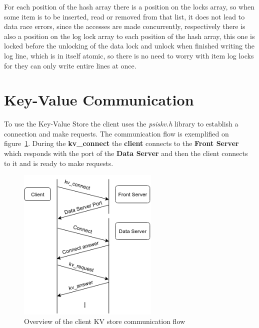 \documentclass[12pt]{article} %
\begin{document}

For each position of the hash array there is a position on the locks array,
so when some item is to be inserted, read or removed from that list, it does not
lead to data race errors, since the accesses are made concurrently, respectively
there is also a position on the log lock array to each position of the hash array,
this one is locked before the unlocking of the data lock and unlock when finished
writing the log line, which is in itself atomic, so there is no need to worry with
item log locks for they can only write entire lines at once.

\section{Key-Value Communication}

To use the Key-Value Store the client uses the \emph{psiskv.h} library to establish a
connection and make requests. The communication flow is exemplified on figure~\ref{fig:Comms}.
During the \textbf{kv\_connect} the \textbf{client} connects to the \textbf{Front Server} which responds
with the port of the \textbf{Data Server} and then the client connects to it and is ready
to make requests.

\begin{figure}[H]
\centering
\includegraphics[width=0.6\textwidth]{./Pictures/CommunicationFlow.png}
\caption{Overview of the client KV store communication flow}\label{fig:Comms}
\end{figure}
\end{document}
